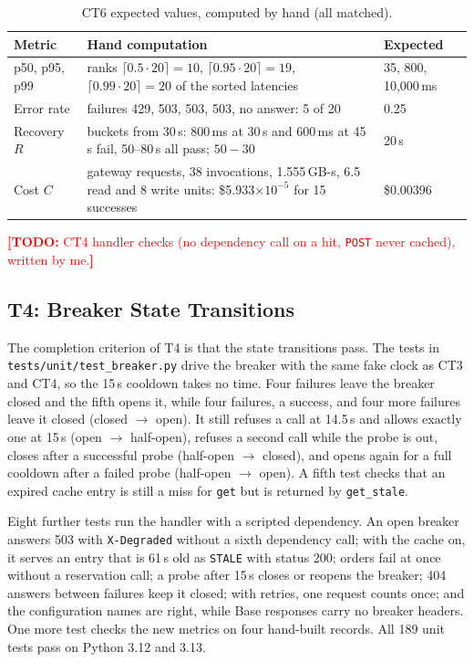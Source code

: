 \documentclass[10pt]{article}
\newcommand{\todo}[1]{\textcolor{red}{\textbf{[TODO:} #1\textbf{]}}}
\begin{document}
\begin{table}[htbp]
\centering
\footnotesize
\begin{tabularx}{\linewidth}{@{}l>{\RaggedRight\arraybackslash}Xl@{}}
\toprule
\textbf{Metric} & \textbf{Hand computation} & \textbf{Expected} \\
\midrule
p50, p95, p99 & ranks $\lceil 0.5 \cdot 20\rceil = 10$, $\lceil 0.95 \cdot 20\rceil = 19$,
  $\lceil 0.99 \cdot 20\rceil = 20$ of the sorted latencies & 35, 800, 10{,}000\,ms \\
Error rate & failures 429, 503, 503, 503, no answer: 5 of 20 & 0.25 \\
Recovery $R$ & buckets from 30\,s: 800\,ms at 30\,s and 600\,ms at 45\,s fail, 50--80\,s all
  pass; $50 - 30$ & 20\,s \\
Cost $C$ & 20 gateway requests, 38 invocations, 1.555\,GB-s, 6.5 read and 8 write units:
  \$5.933$\times 10^{-5}$ for 15 successes & \$0.00396 \\
\bottomrule
\end{tabularx}
\caption{CT6 expected values, computed by hand (all matched).}
\label{tab:ct6}
\end{table}

\todo{CT4 handler checks (no dependency call on a hit, \texttt{POST} never
cached), written by me.}

\subsection{T4: Breaker State Transitions}
The completion criterion of T4 is that the state transitions pass. The tests
in \texttt{tests/unit/test\_breaker.py} drive the breaker with the same fake
clock as CT3 and CT4, so the 15\,s cooldown takes no time. Four failures leave
the breaker closed and the fifth opens it, while four failures, a success, and
four more failures leave it closed (closed $\to$ open). It still refuses a call
at 14.5\,s and allows exactly one at 15\,s (open $\to$ half-open), refuses a
second call while the probe is out, closes after a successful probe
(half-open $\to$ closed), and opens again for a full cooldown after a failed
probe (half-open $\to$ open). A fifth test checks that an expired cache entry
is still a miss for \texttt{get} but is returned by \texttt{get\_stale}.

Eight further tests run the handler with a scripted dependency. An open breaker
answers 503 with \texttt{X-Degraded} without a sixth dependency call; with the
cache on, it serves an entry that is 61\,s old as \texttt{STALE} with status
200; orders fail at once without a reservation call; a probe after 15\,s closes
or reopens the breaker; 404 answers between failures keep it closed; with
retries, one request counts once; and the configuration names are right, while
Base responses carry no breaker headers. One more test checks the new metrics
on four hand-built records. All 189 unit tests pass on Python 3.12 and 3.13.
\end{document}
